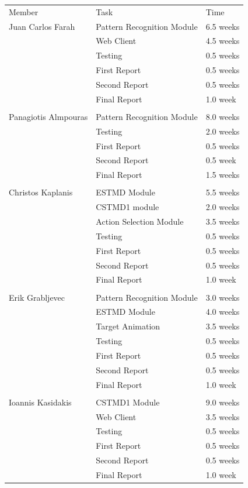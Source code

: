 \documentclass[a4paper,11pt]{article}
\begin{document}
\begin{appendices}
\begin{table}[h]
\centering
\begin{tabular}{|l|l|l|}
\cline{1-3}
Member& Task&  Time  \\ \cline{1-3}
 Juan Carlos Farah&  Pattern Recognition Module&  6.5 weeks  \\ \cline{1-3}
&  Web Client&  4.5 weeks  \\ \cline{1-3}
& Testing& 0.5 weeks \\ \cline{1-3}
&  First Report&  0.5 weeks  \\ \cline{1-3}
&  Second Report&  0.5 weeks  \\ \cline{1-3}
&  Final Report& 1.0 week   \\ \cline{1-3}
&  &    \\ \cline{1-3}
Panagiotis Almpouras&  Pattern Recognition Module& 8.0 weeks  \\ \cline{1-3}
&  Testing&  2.0 weeks  \\ \cline{1-3}
&  First Report&  0.5 weeks  \\ \cline{1-3}
&  Second Report&  0.5 week  \\ \cline{1-3}
&  Final Report&  1.5 weeks  \\ \cline{1-3}
&  &    \\ \cline{1-3}
 Christos Kaplanis&  ESTMD Module&  5.5 weeks  \\ \cline{1-3}
&  CSTMD1 module& 2.0 weeks    \\ \cline{1-3}
&  Action Selection Module&  3.5 weeks  \\ \cline{1-3}
& Testing& 0.5 weeks \\ \cline{1-3}
&  First Report&  0.5 weeks  \\ \cline{1-3}
&  Second Report&  0.5 weeks  \\ \cline{1-3}
&  Final Report&  1.0 week  \\ \cline{1-3}
&  &   \\ \cline{1-3}
Erik Grabljevec&  Pattern Recognition Module&  3.0 weeks  \\ \cline{1-3}
&  ESTMD Module&  4.0 weeks  \\ \cline{1-3}
&  Target Animation&  3.5 weeks  \\ \cline{1-3}
& Testing& 0.5 weeks \\ \cline{1-3}
&  First Report& 0.5 weeks  \\ \cline{1-3}
&  Second Report&  0.5 weeks  \\ \cline{1-3}
&  Final Report&  1.0 week  \\ \cline{1-3}
&  &   \\ \cline{1-3}
Ioannis Kasidakis& CSTMD1 Module& 9.0 weeks  \\ \cline{1-3}
&  Web Client & 3.5 weeks    \\ \cline{1-3}
& Testing& 0.5 weeks \\ \cline{1-3}
&  First Report& 0.5 weeks     \\ \cline{1-3}
&  Second Report& 0.5 weeks   \\ \cline{1-3}
&  Final Report& 1.0 week   \\ \cline{1-3}


\end{tabular}
\end{table}
\end{appendices}
\end{document}
